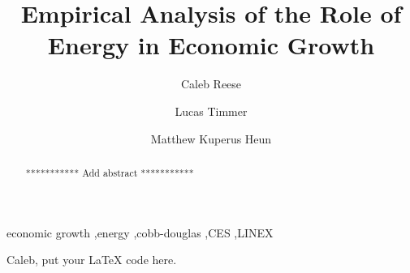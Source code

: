 \documentclass[preprint,authoryear,12pt]{elsarticle}\usepackage{graphicx, color}
\begin{document}
\begin{frontmatter}



\title{Empirical Analysis of the Role of Energy in Economic Growth}


\author[Calvin]{Caleb Reese}
\author[Calvin]{Lucas Timmer}
\author[Calvin]{Matthew Kuperus Heun}

\address[Calvin]{Engineering Department, Calvin College, Grand Rapids, MI 49546, USA}

\begin{abstract}
*********** Add abstract ***********
\end{abstract}

\begin{keyword}
economic growth \sep energy \sep cobb-douglas \sep CES \sep LINEX
\end{keyword}

\end{frontmatter}


Caleb, put your LaTeX code here.
\end{document}
